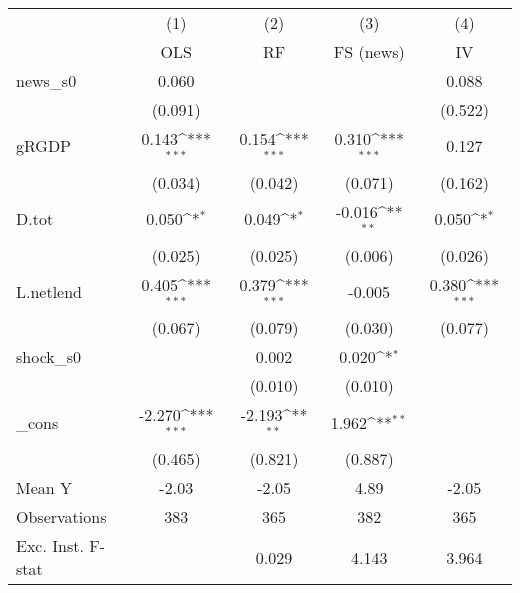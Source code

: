 {
\def\sym#1{\ifmmode^{#1}\else\(^{#1}\)\fi}
\begin{tabular}{l*{4}{c}}
\toprule
            &\multicolumn{1}{c}{(1)}&\multicolumn{1}{c}{(2)}&\multicolumn{1}{c}{(3)}&\multicolumn{1}{c}{(4)}\\
            &\multicolumn{1}{c}{OLS}&\multicolumn{1}{c}{RF}&\multicolumn{1}{c}{FS (news)}&\multicolumn{1}{c}{IV}\\
\midrule
news\_s0     &       0.060         &                     &                     &       0.088         \\
            &     (0.091)         &                     &                     &     (0.522)         \\
\addlinespace
gRGDP       &       0.143\sym{***}&       0.154\sym{***}&       0.310\sym{***}&       0.127         \\
            &     (0.034)         &     (0.042)         &     (0.071)         &     (0.162)         \\
\addlinespace
D.tot       &       0.050\sym{*}  &       0.049\sym{*}  &      -0.016\sym{**} &       0.050\sym{*}  \\
            &     (0.025)         &     (0.025)         &     (0.006)         &     (0.026)         \\
\addlinespace
L.netlend   &       0.405\sym{***}&       0.379\sym{***}&      -0.005         &       0.380\sym{***}\\
            &     (0.067)         &     (0.079)         &     (0.030)         &     (0.077)         \\
\addlinespace
shock\_s0    &                     &       0.002         &       0.020\sym{*}  &                     \\
            &                     &     (0.010)         &     (0.010)         &                     \\
\addlinespace
\_cons      &      -2.270\sym{***}&      -2.193\sym{**} &       1.962\sym{**} &                     \\
            &     (0.465)         &     (0.821)         &     (0.887)         &                     \\
\midrule
Mean Y      &       -2.03         &       -2.05         &        4.89         &       -2.05         \\
Observations&         383         &         365         &         382         &         365         \\
Exc. Inst. F-stat&                     &       0.029         &       4.143         &       3.964         \\
\bottomrule
\end{tabular}
}
